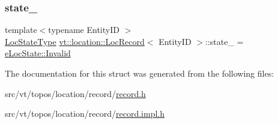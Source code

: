 \mbox{\label{structvt_1_1location_1_1_loc_record_a61f9aee0764759d61b9e3fddebe602cd}} 
\subsubsection{\texorpdfstring{state\+\_\+}{state\_}}
{\footnotesize\ttfamily template$<$typename Entity\+ID $>$ \\
\hyperlink{namespacevt_1_1location_a7a5c74aad68cf57281515029d8521547}{Loc\+State\+Type} \hyperlink{structvt_1_1location_1_1_loc_record}{vt\+::location\+::\+Loc\+Record}$<$ Entity\+ID $>$\+::state\+\_\+ = \hyperlink{namespacevt_1_1location_a7a5c74aad68cf57281515029d8521547a4bbb8f967da6d1a610596d7257179c2b}{e\+Loc\+State\+::\+Invalid}\hspace{0.3cm}{\ttfamily [private]}}



The documentation for this struct was generated from the following files\+:\begin{DoxyCompactItemize}
\item 
src/vt/topos/location/record/\hyperlink{record_8h}{record.\+h}\item 
src/vt/topos/location/record/\hyperlink{record_8impl_8h}{record.\+impl.\+h}\end{DoxyCompactItemize}
